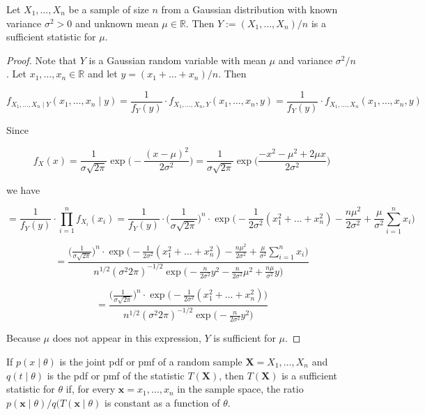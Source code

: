 \begin{example}\label{mathstats.541a.ex.5.3} Let \(X_1, \ldots, X_n\) be a sample of size \(n\) from a Gaussian distribution with known variance \(\sigma^2 > 0\) and unknown mean \(\mu \in \mathbb{R}\). Then \(Y:= (X_1, \ldots, X_n)/n\) is a sufficient statistic for \(\mu\).

\end{example}

\begin{proof} Note that \(Y\) is a Gaussian random variable with mean \(\mu\) and variance \(\sigma^2/n\). Let \(x_1, \ldots, x_n \in \mathbb{R}\) and let \(y = (x_1 + \ldots + x_n)/n\). Then

\[
f_{X_1, \ldots, X_n \mid Y}(x_1, \ldots, x_n \mid y) = \frac{1}{f_Y(y)} \cdot f_{X_1, \ldots , X_n, Y} (x_1, \ldots, x_n, y) = \frac{1}{f_Y(y)} \cdot f_{X_1, \ldots , X_n} (x_1, \ldots, x_n, y)
\]

Since

\[
f_X(x) = \frac{1}{\sigma \sqrt{2 \pi}} \exp \bigg(-\frac{ (x-\mu)^2}{2 \sigma^2} \bigg)  = \frac{1}{\sigma \sqrt{2 \pi}} \exp \bigg(\frac{ -x^2 - \mu^2 + 2 \mu x}{2 \sigma^2} \bigg) 
\]

we have

\[
= \frac{1}{f_Y(y)} \cdot \prod_{i=1}^n f_{X_i}(x_i) = \frac{1}{f_Y(y)} \cdot \bigg( \frac{1}{\sigma \sqrt{2 \pi}} \bigg)^n \cdot \exp \bigg( - \frac{1}{2 \sigma^2}(x_1^2 + \ldots + x_n^2) - \frac{n \mu^2}{2 \sigma^2} + \frac{\mu}{\sigma^2} \sum_{i=1}^n x_i\bigg)
\]

\[
= \frac{ \bigg( \frac{1}{\sigma \sqrt{2 \pi}} \bigg)^n \cdot \exp \bigg( - \frac{1}{2 \sigma^2}(x_1^2 + \ldots + x_n^2) - \frac{n \mu^2}{2 \sigma^2} + \frac{\mu}{\sigma^2} \sum_{i=1}^n x_i\bigg) } {n^{1/2} (\sigma^2 2 \pi)^{-1/2} \exp \bigg( - \frac{n}{2 \sigma^2} y^2 - \frac{n}{2 \sigma^2} \mu^2 + \frac{n \mu}{\sigma^2} y \bigg) }
\]

\[
= \frac{ \bigg( \frac{1}{\sigma \sqrt{2 \pi}} \bigg)^n \cdot \exp \bigg( - \frac{1}{2 \sigma^2}(x_1^2 + \ldots + x_n^2)\bigg) } {n^{1/2} (\sigma^2 2 \pi)^{-1/2} \exp \bigg( - \frac{n}{2 \sigma^2} y^2  \bigg) }
\]

Because \(\mu\) does not appear in this expression, \(Y\) is sufficient for \(\mu\).

\end{proof}

\begin{theorem} If \(p(x \mid \theta)\) is the joint pdf or pmf of a random sample \(\boldsymbol{X} = X_1, \ldots, X_n\) and \(q(t\mid \theta)\) is the pdf or pmf of the statistic \(T(\boldsymbol{X})\), then \(T(\boldsymbol{X})\) is a sufficient statistic for \(\theta\) if, for every \(\boldsymbol{x} = x_1, \ldots, x_n\) in the sample space, the ratio \(p(\boldsymbol{x} \mid \theta)/q(T(\boldsymbol{x} \mid \theta)\) is constant as a function of \(\theta\).

\end{theorem}

